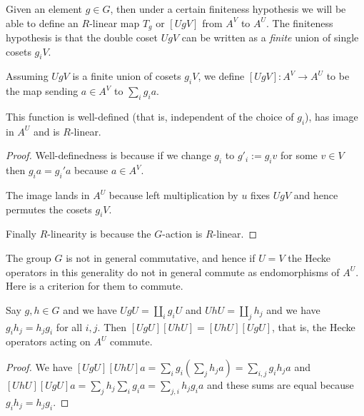 Given an element $g\in G$, then under a certain finiteness hypothesis
we will be able to define an $R$-linear map $T_g$ or $[UgV]$
from $A^V$ to $A^U$. The finiteness hypothesis is that the
double coset $UgV$ can be written as a \emph{finite} union of single
cosets $g_iV$.

\begin{definition}
  \label{AbstractHeckeOperator.HeckeOperatorToFun}
  \leanok
  Assuming $UgV$ is a finite union of cosets $g_iV$,
  we define $[UgV]:A^V\to A^U$ to be the map sending $a\in A^V$
  to $\sum_i g_ia.$
\end{definition}

\begin{lemma}
  \label{AbstractHeckeOperator.HeckeOperator}
  \leanok
  This function is well-defined (that is, independent of the
  choice of $g_i$), has image in $A^U$ and is $R$-linear.
\end{lemma}
\begin{proof}
  \leanok
  Well-definedness is because if we change $g_i$ to $g'_i:=g_iv$
  for some $v\in V$ then $g_ia=g_i'a$ because $a\in A^V$.

  The image lands in $A^U$ because left multiplication by $u$
  fixes $UgV$ and hence permutes the cosets $g_iV$.

  Finally $R$-linearity is because the $G$-action is $R$-linear.
\end{proof}

The group $G$ is not in general commutative, and hence if $U=V$
the Hecke operators in this generality do not in general commute
as endomorphisms of $A^U$. Here is a criterion for
them to commute.

\begin{lemma}
  \label{AbstractHeckeOperator.comm}
  \leanok
  Say $g,h\in G$ and we have $UgU=\coprod_i g_iU$
  and $UhU=\coprod_j h_j$ and we have $g_ih_j=h_jg_i$ for all $i,j$.
  Then $[UgU][UhU]=[UhU][UgU]$, that is, the Hecke operators
  acting on $A^U$ commute.
\end{lemma}
\begin{proof}
  \leanok
  We have $[UgU][UhU]a=\sum_ig_i(\sum_jh_ja)=\sum_{i,j}g_ih_ja$
  and $[UhU][UgU]a=\sum_jh_j\sum_ig_ia=\sum_{j,i}h_jg_ia$ and these
  sums are equal because $g_ih_j=h_jg_i$.
\end{proof}

